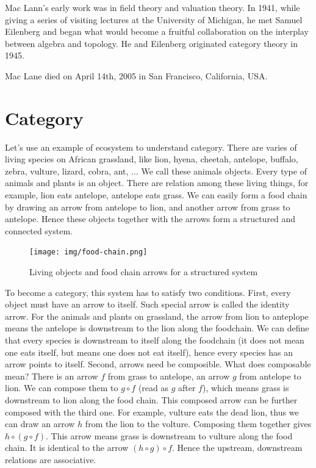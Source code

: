 \documentclass[b5paper]{article}
\begin{document}
Mac Lann's early work was in field theory and valuation theory. In 1941, while giving a series of visiting lectures at the University of Michigan, he met Samuel Eilenberg and began what would become a fruitful collaboration on the interplay between algebra and topology. He and Eilenberg originated category theory in 1945.

Mac Lane died on April 14th, 2005 in San Francisco, California, USA.

\section{Category}

Let's use an example of ecosystem to understand category. There are varies of living species on African grassland, like lion, hyena, cheetah, antelope, buffalo, zebra, vulture, lizard, cobra, ant, ... We call these animals objects. Every type of animals and plants is an object. There are relation among these living things, for example, lion eats antelope, antelope eats grass. We can easily form a food chain by drawing an arrow from antelope to lion, and another arrow from grass to antelope. Hence these objects together with the arrows form a structured and connected system.

\begin{figure}[htbp]
 \centering
 \texttt{[image: img/food-chain.png]}
 \caption{Living objects and food chain arrows for a structured system}
 \label{fig:food-chain}
\end{figure}

To become a category, this system has to satisfy two conditions. First, every object must have an arrow to itself. Such special arrow is called the identity arrow. For the animals and plants on grassland, the arrow from lion to anteplope means the antelope is downstream to the lion along the foodchain. We can define that every species is downstream to itself along the foodchain (it does not mean one eats itself, but means one does not eat itself), hence every species has an arrow points to itself. Second, arrows need be composible. What does composable mean? There is an arrow $f$ from grass to antelope, an arrow $g$ from antelope to lion. We can compose them to $g \circ f$ (read as $g$ after $f$), which means grass is downstream to lion along the food chain. This composed arrow can be further composed with the third one. For example, vulture eats the dead lion, thus we can draw an arrow $h$ from the lion to the volture. Composing them together gives $h \circ (g \circ f)$. This arrow means grass is downstream to vulture along the food chain. It is identical to the arrow $(h \circ g) \circ f$. Hence the upstream, downstream relations are associative.
\end{document}
